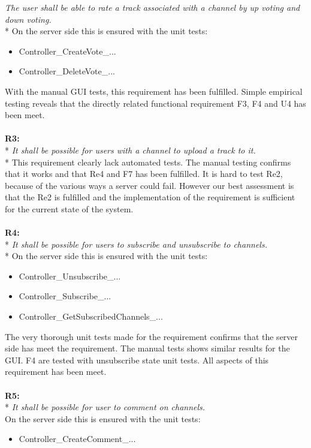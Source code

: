 \documentclass[a4paper,11pt,report]{article}
\begin{document}
\textit{The user shall be able to rate a track associated with a channel by up voting and down voting.} \\*
On the server side this is ensured with the unit tests:
\begin{itemize}
\item Controller\_CreateVote\_...
\item Controller\_DeleteVote\_...
\end{itemize}
With the manual GUI tests, this requirement has been fulfilled. Simple empirical testing reveals that the directly related functional requirement F3, F4 and U4 has been meet. \\ \\
\textbf{R3:} \\*
\textit{It shall be possible for users with a channel to upload a track to it.} \\*
This requirement clearly lack automated tests. The manual testing confirms that it works and that Re4 and F7 has been fulfilled. It is hard to test Re2, because of the various ways a server could fail. However our best assessment is that the Re2 is fulfilled and the implementation of the requirement is sufficient for the current state of the system. \\ \\
\textbf{R4:} \\*
\textit{It shall be possible for users to subscribe and unsubscribe to channels.} \\*
On the server side this is ensured with the unit tests:
\begin{itemize}
\item Controller\_Unsubscribe\_...
\item Controller\_Subscribe\_...
\item Controller\_GetSubscribedChannels\_...
\end{itemize}
The very thorough unit tests made for the requirement confirms that the server side has meet the requirement. The manual tests shows similar results for the GUI. F4 are tested with unsubscribe state unit tests. All aspects of this requirement has been meet. \\ \\
\textbf{R5:} \\*
\textit{It shall be possible for user to comment on channels.} \\
On the server side this is ensured with the unit tests:
\begin{itemize}
\item Controller\_CreateComment\_...
\end{itemize}
\end{document}
